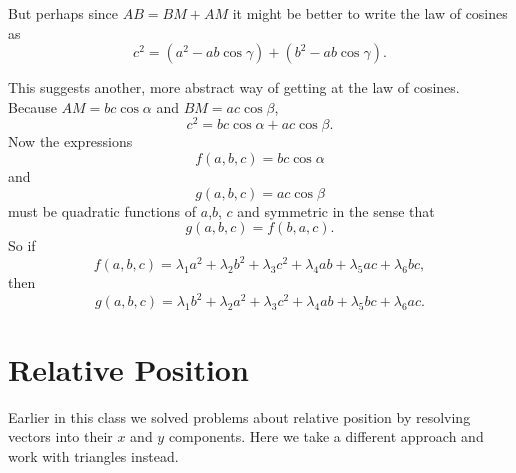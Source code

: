 \documentclass{ximera}
\begin{document}
\begin{exploration}
But perhaps since $AB = BM +AM$ it might be better to write the law of cosines as
\[
   c^2 = (a^2 -ab\cos\gamma) + (b^2- ab\cos \gamma) .
\]

This suggests another, more abstract way of getting at the law of cosines. Because $AM = bc \cos \alpha$ and $BM = ac \cos\beta$,
\[
   c^2 = bc \cos \alpha + ac \cos \beta .
\]
Now the expressions 
\[
   f(a,b,c) = bc \cos\alpha
\]
and
\[
   g(a,b,c) = ac \cos \beta
\]
must be quadratic functions of $a$,$b$, $c$ and symmetric in the sense that
\[
  g(a,b,c) = f(b,a,c) .
\]
So if
\[
  f(a,b,c) = \lambda_1 a^2 + \lambda_2 b^2 + \lambda_3 c^2 + \lambda_4 ab + \lambda_5 ac + \lambda_6 bc ,
\]
then
\[
  g(a,b,c) = \lambda_1 b^2 + \lambda_2 a^2 + \lambda_3 c^2 + \lambda_4 ab + \lambda_5 bc + \lambda_6 ac  .
\]

\end{exploration}



\section{Relative Position}
Earlier in this class we solved problems about relative position by resolving vectors into their $x$ and $y$ components. Here we take a different approach and work with triangles instead.
\end{document}
